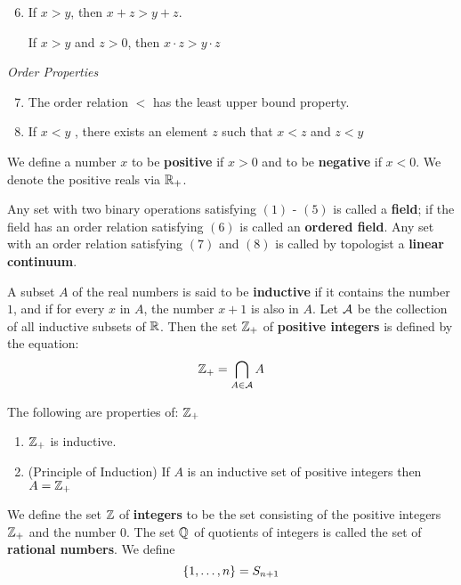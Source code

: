 \begin{enumerate}
	\setcounter{enumi}{5}
	\item If $ x > y$, then $ x +z > y+z $.
	
	If $ x > y  $ and $ z > 0 $, then $ x \cdot z > y \cdot z $
\end{enumerate}

\textit{Order Properties}

\begin{enumerate}
	\setcounter{enumi}{6}
	\item The order relation $ < $ has the least upper bound property.
	\item If $ x < y $ , there exists an element $z$ such that $ x < z$ and $ z < y$
\end{enumerate}

We define a number $x$ to be \textbf{positive} if $  x > 0 $ and to be \textbf{negative} if $ x<0 $. We denote the positive reals via $\mathbb{R}_+$.

Any set with two binary operations satisfying $(1)$ - $(5)$ is called a \textbf{field}; if the field has an order relation satisfying $ (6) $ is called an \textbf{ordered field}. Any set with an order relation satisfying $(7)$ and $(8)$ is called by topologist a \textbf{linear continuum}.

\begin{define}
	A subset $A$ of the real numbers is said to be \textbf{inductive} if it contains the number $1$, and if for every $x$ in $A$, the number $x+1$ is also in $A$. Let $\mathcal{A}$ be the collection of all inductive subsets of $\mathbb{R}$. Then the set $\mathbb{Z}_+$ of \textbf{positive integers} is defined by the equation:
	\[ \mathbb{Z}_+ = \bigcap_{A \in \mathcal{A}} A \]
	
\end{define}

The following are properties of: $ \mathbb{Z}_+ $ 

\begin{enumerate}
	\item $ \mathbb{Z}_+ $ is inductive.
	\item (Principle of Induction) If $A$ is an inductive set of positive integers then $ A= \mathbb{Z}_+ $
\end{enumerate}
We define the set $ \mathbb{Z} $ of \textbf{integers} to be the set consisting of the positive integers $ \mathbb{Z}_+ $ and the number $ 0  $. The set $ \mathbb{Q}  $ of quotients of integers is called the set of \textbf{rational numbers}.
We define
\[ \left\lbrace 1, \ldots, n \right\rbrace = S_{n+1} \]

